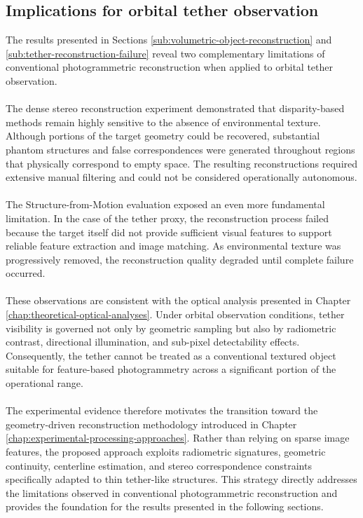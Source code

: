 \subsection{Implications for orbital tether observation}
The results presented in Sections \ref{sub:volumetric-object-reconstruction} and \ref{sub:tether-reconstruction-failure}  reveal two complementary limitations of conventional photogrammetric reconstruction when applied to orbital tether observation.
\\\\
The dense stereo reconstruction experiment demonstrated that disparity-based methods remain highly sensitive to the absence of environmental texture. Although portions of the target geometry could be recovered, substantial phantom structures and false correspondences were generated throughout regions that physically correspond to empty space. The resulting reconstructions required extensive manual filtering and could not be considered operationally autonomous.
\\\\
The Structure-from-Motion evaluation exposed an even more fundamental limitation. In the case of the tether proxy, the reconstruction process failed because the target itself did not provide sufficient visual features to support reliable feature extraction and image matching. As environmental texture was progressively removed, the reconstruction quality degraded until complete failure occurred.
\\\\
These observations are consistent with the optical analysis presented in Chapter \ref{chap:theoretical-optical-analyses}. Under orbital observation conditions, tether visibility is governed not only by geometric sampling but also by radiometric contrast, directional illumination, and sub-pixel detectability effects. Consequently, the tether cannot be treated as a conventional textured object suitable for feature-based photogrammetry across a significant portion of the operational range.
\\\\
The experimental evidence therefore motivates the transition toward the geometry-driven reconstruction methodology introduced in Chapter \ref{chap:experimental-processing-approaches}. Rather than relying on sparse image features, the proposed approach exploits radiometric signatures, geometric continuity, centerline estimation, and stereo correspondence constraints specifically adapted to thin tether-like structures. This strategy directly addresses the limitations observed in conventional photogrammetric reconstruction and provides the foundation for the results presented in the following sections.

